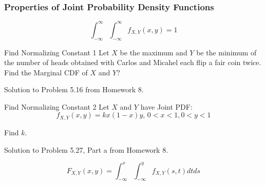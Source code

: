 		\subsubsection{Properties of Joint Probability Density Functions} \label{subsubsec:Joint PDF Properties}
			\begin{propertylist}
				\item
					\begin{equation}
						\int_{-\infty}^{\infty} \int_{-\infty}^{\infty} f_{X,Y} \left( x,y \right) = 1
					\end{equation}
			\end{propertylist}
                        \begin{example}[Example 5.16]{Find Normalizing Constant 1}
                          Let $X$ be the maximum and $Y$ be the minimum of the number of heads obtained with Carlos and Micahel each flip a fair coin twice.
                          Find the Marginal CDF of $X$ and $Y$?

                          \tcblower

                          Solution to Problem 5.16 from Homework 8.
                        \end{example}
				\begin{example}[Problem 5.27]{Find Normalizing Constant 2}
					Let $X$ and $Y$ have Joint PDF:
					\begin{equation*}
						f_{X,Y} \left( x,y \right) = k x \left( 1-x \right) y \text{, } 0<x<1, 0<y<1
					\end{equation*}
					\begin{boldalphlist}
						\item Find $k$.
					\end{boldalphlist}

					\tcblower

					Solution to Problem 5.27, Part a from Homework 8.
				\end{example}
			\begin{propertylist}[resume]
				\item
					\begin{equation}
						F_{X,Y} \left( x,y \right) = \int_{-\infty}^{x} \int_{-\infty}^{y} f_{X,Y} \left( s,t \right) dt ds
					\end{equation}
			\end{propertylist}
